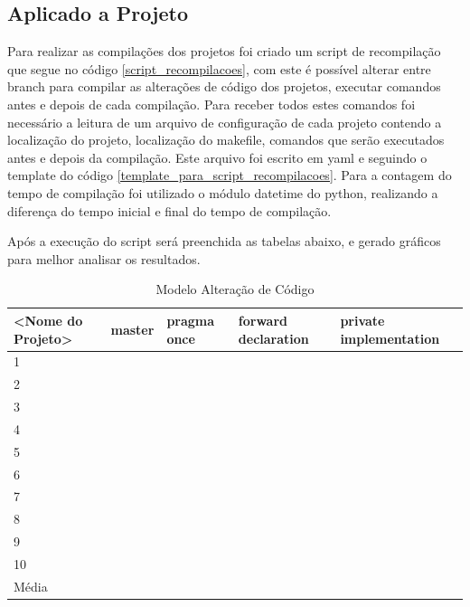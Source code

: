 \subsection{Aplicado a Projeto}

Para realizar as compilações dos projetos foi criado um script de recompilação que
 segue no código \ref{script_recompilacoes}, com este é possível alterar entre
 branch para compilar as alterações de código dos projetos,
 executar comandos antes e depois de cada compilação.
 Para receber todos estes comandos foi necessário a leitura de um arquivo de
 configuração de cada projeto contendo a localização do projeto,
 localização do makefile, comandos que serão executados antes e depois
 da compilação.
 Este arquivo foi escrito em yaml e seguindo o template do código
 \ref{template_para_script_recompilacoes}.
Para a contagem do tempo de compilação foi utilizado o módulo datetime do python,
 realizando a diferença do tempo inicial e final do tempo de compilação.

Após a execução do script será preenchida as tabelas abaixo, e gerado gráficos para melhor
analisar os resultados. 


\begin{table}[!ht]
\centering
\caption{Modelo Alteração de Código}
\label{tab:modelo_alteracao_de_codigo}
\begin{tabular}{lllll}
\textbf{<Nome do Projeto>} & \textbf{master} & \textbf{pragma once} & \textbf{forward declaration} & \textbf{private implementation}   \\ \toprule
1                             &      &     &     &        \\ 
2                             &      &     &     &        \\ 
3                             &      &     &     &        \\ 
4                             &      &     &     &        \\ 
5                             &      &     &     &        \\ 
6                             &      &     &     &        \\ 
7                             &      &     &     &        \\ 
8                             &      &     &     &        \\ 
9                             &      &     &     &        \\ 
10                            &      &     &     &        \\ \bottomrule
Média                         &      &     &     &        \\ 
\end{tabular}
\end{table}


